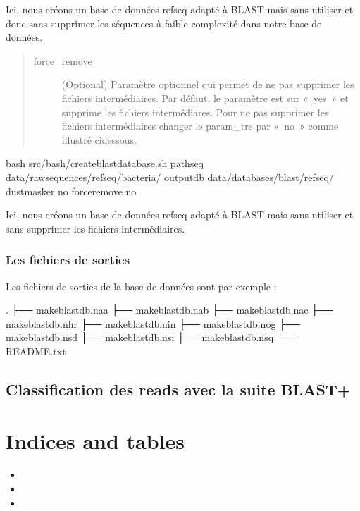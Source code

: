 \documentclass[letterpaper,10pt,french]{sphinxmanual}
\begin{document}
Ici, nous créons un base de données refseq adapté à BLAST mais sans utiliser  et donc sans supprimer les séquences à faible complexité dans notre base de données.
\begin{quote}\begin{description}
\item[{\sphinxhyphen{}force\_remove}] \leavevmode
(Optional) Paramètre optionnel qui permet de ne pas supprimer les fichiers intermédiaires. Par défaut, le paramètre est sur « yes » et supprime les fichiers intermédiares. Pour ne pas supprimer les fichiers intermédiaires changer le param\_tre par « no » comme illustré ci\sphinxhyphen{}dessous.

\end{description}\end{quote}

\begin{sphinxVerbatim}[commandchars=\\\{\}]
bash src/bash/create\PYGZus{}blast\PYGZus{}database.sh 
             \PYGZhy{}path\PYGZus{}seq data/raw\PYGZus{}sequences/refseq/bacteria/ 
             \PYGZhy{}output\PYGZus{}db data/databases/blast/refseq/ 
             \PYGZhy{}dustmasker no
             \PYGZhy{}force\PYGZus{}remove no
\end{sphinxVerbatim}

Ici, nous créons un base de données refseq adapté à BLAST mais sans utiliser  et sans supprimer les fichiers intermédiaires.


\subsubsection{Les fichiers de sorties}
\label{\detokenize{tutorial:id36}}
Les fichiers de sorties de la base de données sont par exemple :

\begin{sphinxVerbatim}[commandchars=\\\{\}]
.
├── makeblastdb.naa
├── makeblastdb.nab
├── makeblastdb.nac
├── makeblastdb.nhr
├── makeblastdb.nin
├── makeblastdb.nog
├── makeblastdb.nsd
├── makeblastdb.nsi
├── makeblastdb.nsq
└── README.txt
\end{sphinxVerbatim}


\subsection{Classification des reads avec la suite BLAST+}
\label{\detokenize{tutorial:classification-des-reads-avec-la-suite-blast}}\label{\detokenize{tutorial:classification-blast}}

\section{Indices and tables}
\label{\detokenize{index:indices-and-tables}}\begin{itemize}
\item {} 

\item {} 

\item {} 

\end{itemize}



\renewcommand{\indexname}{Index}
\printindex
\end{document}
